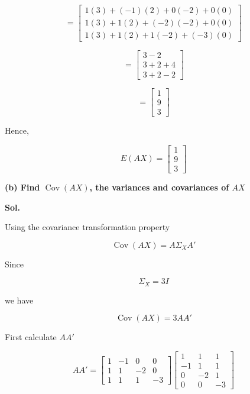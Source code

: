 \documentclass[12pt]{article}
\begin{document}
\[
=
\begin{bmatrix}
1(3)+(-1)(2)+0(-2)+0(0)\\
1(3)+1(2)+(-2)(-2)+0(0)\\
1(3)+1(2)+1(-2)+(-3)(0)
\end{bmatrix}
\]

\[
=
\begin{bmatrix}
3-2\\
3+2+4\\
3+2-2
\end{bmatrix}
\]

\[
=
\begin{bmatrix}
1\\
9\\
3
\end{bmatrix}
\]

\noindent
Hence,

\[
\boxed{
E(AX)
=
\begin{bmatrix}
1\\
9\\
3
\end{bmatrix}
}
\]

\vspace{1cm}

\noindent
\textbf{(b) Find \(\operatorname{Cov}(AX)\), the variances and covariances of \(AX\)}

\vspace{0.5cm}

\noindent
\textbf{Sol.}

\vspace{0.3cm}

\noindent
Using the covariance transformation property

\[
\operatorname{Cov}(AX)
=
A\Sigma_XA'
\]

\noindent
Since

\[
\Sigma_X
=
3I
\]

\noindent
we have

\[
\operatorname{Cov}(AX)
=
3AA'
\]

\noindent
First calculate \(AA'\)

\[
AA'
=
\begin{bmatrix}
1 & -1 & 0 & 0\\
1 & 1 & -2 & 0\\
1 & 1 & 1 & -3
\end{bmatrix}
\begin{bmatrix}
1 & 1 & 1\\
-1 & 1 & 1\\
0 & -2 & 1\\
0 & 0 & -3
\end{bmatrix}
\]
\end{document}
